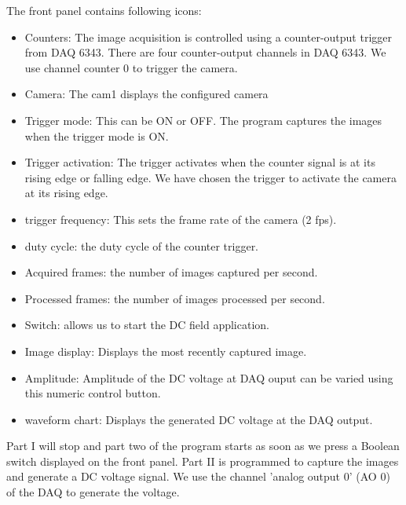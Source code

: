 \documentclass[journal=jacsat,manuscript=article]{achemso}
\begin{document}
The front panel contains following icons:
\begin{itemize}
  \item Counters: The image acquisition is controlled using a counter-output trigger
from DAQ 6343. There are four counter-output channels in DAQ 6343. We
use channel counter 0 to trigger the camera.

 \item Camera: The cam1 displays the configured
   camera

   \item Trigger mode: This can be ON or OFF. The program captures the
     images when the trigger mode is ON.  
     \item Trigger activation: The trigger activates
       when the counter signal is at its rising edge or falling edge. We have
       chosen the trigger to activate the camera at its rising edge.
       
     \item trigger frequency: This sets the frame rate of the camera (2 fps).

 \item duty cycle:  the duty cycle of the
   counter trigger.
 \item Acquired frames: the number of images captured per second.
   \item Processed frames:  the number of images
     processed per second.
     \item Switch: allows us to start the DC field application.
     \item Image display: Displays the most recently captured image.
     \item Amplitude: Amplitude of the DC voltage at DAQ ouput can be varied using this numeric control button.
     \item waveform chart: Displays the generated DC voltage at the DAQ output.
\end{itemize}

Part I will stop and part two of the program starts as soon as we press a Boolean switch displayed on the front panel. Part II is programmed to capture the images and generate a DC voltage signal. We use the channel 'analog output 0' (AO 0) of the DAQ to generate the voltage. 
\end{document}
